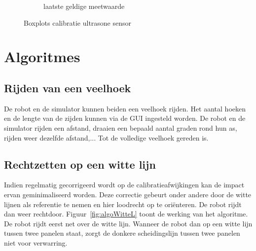 \documentclass[t1]{penoverslag}
\begin{document}
\begin{figure}
\begin{subfigure}[h]{0.31\textwidth}
                \caption{laatste geldige meetwaarde}
        \end{subfigure}
 \caption{Boxplots calibratie ultrasone sensor}
\label{fig:calibUS}
\end{figure}



\section{Algoritmes} %
\label{sec:algo}
\subsection{Rijden van een veelhoek} %
\label{ssec:algoVeelH}
De robot en de simulator kunnen beiden een veelhoek rijden. Het aantal hoeken en de lengte van de zijden kunnen via de GUI ingesteld worden. De robot en de simulator rijden een afstand, draaien een bepaald aantal graden rond hun as, rijden weer dezelfde afstand,... Tot de volledige veelhoek gereden is.

\subsection{Rechtzetten op een witte lijn} %
\label{ssec:algoWitteL}
Indien regelmatig gecorrigeerd wordt op de calibratieafwijkingen kan de impact ervan geminimaliseerd worden. Deze correctie gebeurt onder andere door de witte lijnen als referentie te nemen en hier loodrecht op te ori\"enteren. De robot rijdt dan weer rechtdoor. Figuur~\ref{fig:algoWitteL} toont de werking van het algoritme. De robot rijdt eerst net over de witte lijn. Wanneer de robot dan op een witte lijn tussen twee panelen staat, zorgt de donkere scheidingslijn tussen twee panelen niet voor verwarring.
\end{document}
